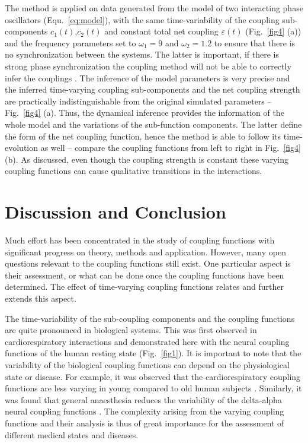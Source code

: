 \documentclass[pre,aps,twocolumn,showpacs]{revtex4}
\begin{document}
The method is applied on data generated from the model of two interacting phase oscillators (Equ.\ \ref{eq:model}), with the same time-variability of the coupling sub-components $c_1(t)$,$c_2(t)$ and constant total net coupling $\varepsilon(t)$ (Fig.\ \ref{fig4} (a)) and the frequency parameters set to $\omega_1=9$ and $\omega_2=1.2$ to ensure that there is no synchronization between the systems.  The latter is important, if there is strong phase synchronization the coupling method will not be able to correctly infer the couplings \cite{Rosenblum:01}.
The inference of the model parameters is very precise and the inferred time-varying coupling sub-components and the net coupling strength are practically indistinguishable from the original simulated parameters -- Fig.\ \ref{fig4} (a). Thus, the dynamical inference provides the information of the whole model and the variations of the sub-function components. The latter define the form of the net coupling function, hence the method is able to follow its time-evolution as well -- compare the coupling functions from left to right in Fig.\ \ref{fig4} (b). As discussed, even though the coupling strength is constant these varying coupling functions can cause qualitative transitions in the interactions.



\section{Discussion and Conclusion}

Much effort has been concentrated in the study of coupling functions with significant progress on theory, methods and application. However, many open questions relevant to the coupling functions still exist. One particular aspect is their assessment, or what can be done once the coupling functions have been determined. The effect of time-varying coupling functions relates and further extends this aspect.

The time-variability of the sub-coupling components and the coupling functions are quite pronounced in  biological systems. This was first observed in cardiorespiratory interactions and demonstrated here with the neural coupling functions of the human resting state (Fig.\ \ref{fig1}). It is important to note that the variability of the biological coupling functions can depend on the physiological state or disease. For example, it was observed that the cardiorespiratory coupling functions are less varying in young compared to old human subjects \cite{Iatsenko:13a,Kralemann:13b}. Similarly, it was found that general anaesthesia reduces the variability of the delta-alpha neural coupling functions \cite{Stankovski:16}. The complexity arising from the varying coupling functions and their analysis is thus of great importance for the assessment of different medical states and diseases.
\end{document}
